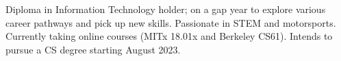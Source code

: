 

\begin{cvparagraph}

Diploma in Information Technology holder; on a gap year to explore various career pathways and pick up new skills. Passionate in STEM and motorsports. 
Currently taking online courses (MITx 18.01x and Berkeley CS61). Intends to pursue a CS degree starting August 2023. 
\end{cvparagraph}
